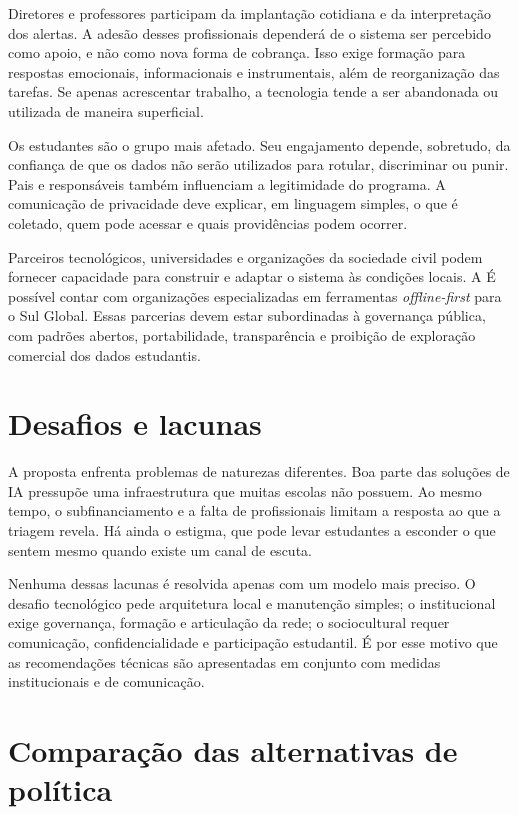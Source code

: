 Diretores e professores participam da implantação cotidiana e da interpretação
dos alertas. A adesão desses profissionais dependerá de o sistema ser percebido
como apoio, e não como nova forma de cobrança. Isso exige formação para respostas
emocionais, informacionais e instrumentais, além de reorganização das tarefas.
Se apenas acrescentar trabalho, a tecnologia tende a ser abandonada ou utilizada
de maneira superficial.

Os estudantes são o grupo mais afetado. Seu engajamento depende, sobretudo, da
confiança de que os dados não serão utilizados para rotular, discriminar ou
punir. Pais e responsáveis também influenciam a legitimidade do programa. A
comunicação de privacidade deve explicar, em linguagem simples, o que é coletado,
quem pode acessar e quais providências podem ocorrer.

Parceiros tecnológicos, universidades e organizações da sociedade civil podem
fornecer capacidade para construir e adaptar o sistema às condições locais. A
É possível contar com organizações especializadas em ferramentas
\emph{offline-first} para o Sul Global. Essas parcerias devem estar subordinadas
à governança pública, com padrões abertos, portabilidade, transparência e
proibição de exploração comercial dos dados estudantis.

\section{Desafios e lacunas}

A proposta enfrenta problemas de naturezas diferentes. Boa parte das soluções
de IA pressupõe uma infraestrutura que muitas escolas não possuem. Ao mesmo
tempo, o subfinanciamento e a falta de profissionais limitam a resposta ao que a
triagem revela. Há ainda o estigma, que pode levar estudantes a esconder o que
sentem mesmo quando existe um canal de escuta.

Nenhuma dessas lacunas é resolvida apenas com um modelo mais preciso. O desafio
tecnológico pede arquitetura local e manutenção simples; o institucional exige
governança, formação e articulação da rede; o sociocultural requer comunicação,
confidencialidade e participação estudantil. É por esse motivo que as
recomendações técnicas são apresentadas em conjunto com medidas institucionais e
de comunicação.

\section{Comparação das alternativas de política}

